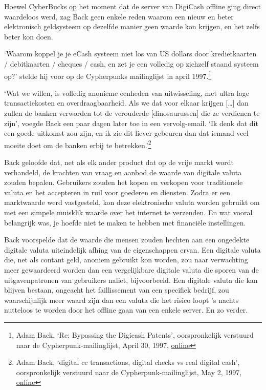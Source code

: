 \documentclass[
  a5paper,
  smalldemyvopaper,11pt,twoside,onecolumn,openright,extrafontsizes]{memoir}
\begin{document}
Hoewel CyberBucks op het moment dat de server van DigiCash offline ging
direct waardeloos werd, zag Back geen enkele reden waarom een nieuw en
beter elektronisch geldsysteem op dezelfde manier geen waarde kon
krijgen, en het zelfs beter kon doen.

`Waarom koppel je je eCash systeem niet los van US dollars door
kredietkaarten / debitkaarten / cheques / cash, en zet je een volledig
op zichzelf staand systeem op?' stelde hij voor op de Cypherpunks
mailinglijst in april 1997.\footnote{Adam Back, `Re: Bypassing the
  Digicash Patents', oorspronkelijk verstuurd naar de
  Cypherpunk-mailinglijst, April 30, 1997,
  \href{https://cypherpunks.venona.com/date/1997/04/msg00822.html}{online}}

`Wat we willen, is volledig anonieme eenheden van uitwisseling, met
ultra lage transactiekosten en overdraagbaarheid. Als we dat voor elkaar
krijgen {[}\ldots{]} dan zullen de banken verworden tot de verouderde
{[}dinosaurussen{]} die ze verdienen te zijn', voegde Back een paar
dagen later toe in een vervolg-email. `Ik denk dat dit een goede
uitkomst zou zijn, en ik zie dit liever gebeuren dan dat iemand veel
moeite doet om de banken erbij te betrekken.'\footnote{Adam Back,
  `digital cc transactions, digital checks vs real digital cash',
  oorspronkelijk verstuurd naar de Cypherpunk-mailinglijst, May 2, 1997,
  \href{https://cypherpunks.venona.com/date/1997/05/msg00104.html}{online}}

Back geloofde dat, net als elk ander product dat op de vrije markt wordt
verhandeld, de krachten van vraag en aanbod de waarde van digitale
valuta zouden bepalen. Gebruikers zouden het kopen en verkopen voor
traditionele valuta en het accepteren in ruil voor goederen en diensten.
Zodra er een marktwaarde werd vastgesteld, kon deze elektronische valuta
worden gebruikt om met een simpele muisklik waarde over het internet te
verzenden. En wat vooral belangrijk was, je hoefde niet te maken te
hebben met financiële instellingen.

Back voorspelde dat de waarde die mensen zouden hechten aan een
ongedekte digitale valuta uiteindelijk afhing van de eigenschappen
ervan. Een digitale valuta die, net als contant geld, anoniem gebruikt
kon worden, zou naar verwachting meer gewaardeerd worden dan een
vergelijkbare digitale valuta die sporen van de uitgavenpatronen van
gebruikers naliet, bijvoorbeeld. Een digitale valuta die kan blijven
bestaan, ongeacht het faillissement van een specifiek bedrijf, zou
waarschijnlijk meer waard zijn dan een valuta die het risico loopt 's
nachts nutteloos te worden door het offline gaan van een enkele server.
En zo verder.
\end{document}
